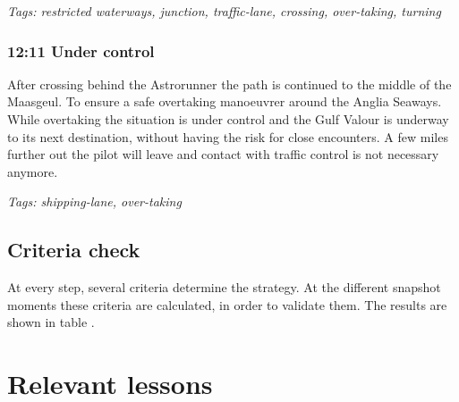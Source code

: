 \emph{Tags: restricted waterways, junction, traffic-lane, crossing, over-taking, turning}

\subsubsection{12:11 Under control}
After crossing behind the Astrorunner the path is continued to the middle of the Maasgeul. To ensure a safe overtaking manoeuvrer around the Anglia Seaways. While overtaking the situation is under control and the Gulf Valour is underway to its next destination, without having the risk for close encounters. A few miles further out the pilot will leave and contact with traffic control is not necessary anymore.

\emph{Tags: shipping-lane, over-taking}

\subsection{Criteria check}
At every step, several criteria determine the strategy. At the different snapshot moments these criteria are calculated, in order to validate them. The results are shown in table .


\section{Relevant lessons}
